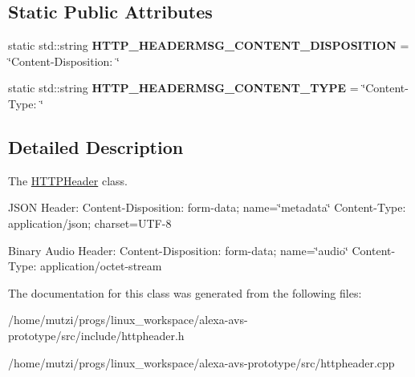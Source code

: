\subsection*{Static Public Attributes}
\begin{DoxyCompactItemize}
\item 
\mbox{\label{classNetwork_1_1HTTP_1_1HTTPHeader_a38ca07e5cbe32cfc51e22abad2fedae0}} 
static std\+::string {\bfseries H\+T\+T\+P\+\_\+\+H\+E\+A\+D\+E\+R\+M\+S\+G\+\_\+\+C\+O\+N\+T\+E\+N\+T\+\_\+\+D\+I\+S\+P\+O\+S\+I\+T\+I\+ON} = \char`\"{}Content-\/Disposition\+: \char`\"{}
\item 
\mbox{\label{classNetwork_1_1HTTP_1_1HTTPHeader_a22522701d469ddb20b5dd2d641f5e4f1}} 
static std\+::string {\bfseries H\+T\+T\+P\+\_\+\+H\+E\+A\+D\+E\+R\+M\+S\+G\+\_\+\+C\+O\+N\+T\+E\+N\+T\+\_\+\+T\+Y\+PE} = \char`\"{}Content-\/Type\+: \char`\"{}
\end{DoxyCompactItemize}


\subsection{Detailed Description}
The \hyperlink{classNetwork_1_1HTTP_1_1HTTPHeader}{H\+T\+T\+P\+Header} class. 

J\+S\+ON Header\+: Content-\/\+Disposition\+: form-\/data; name=\char`\"{}metadata\char`\"{} Content-\/\+Type\+: application/json; charset=U\+T\+F-\/8

Binary Audio Header\+: Content-\/\+Disposition\+: form-\/data; name=\char`\"{}audio\char`\"{} Content-\/\+Type\+: application/octet-\/stream 

The documentation for this class was generated from the following files\+:\begin{DoxyCompactItemize}
\item 
/home/mutzi/progs/linux\+\_\+workspace/alexa-\/avs-\/prototype/src/include/httpheader.\+h\item 
/home/mutzi/progs/linux\+\_\+workspace/alexa-\/avs-\/prototype/src/httpheader.\+cpp\end{DoxyCompactItemize}
